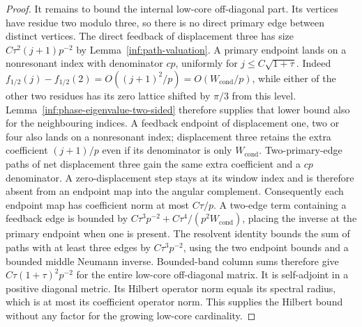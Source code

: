 \begin{proof}
It remains to bound the internal low-core off-diagonal part.
Its vertices have residue two modulo three, so there is no direct
primary edge between distinct vertices. The direct feedback of
displacement three has size
$C\tau^2(j+1)p^{-2}$ by Lemma~\ref{inf:path-valuation}.
A primary endpoint lands on a nonresonant index with denominator
$cp$, uniformly for $j\le C\sqrt{1+\tau}$.
Indeed $f_{1/2}(j)-f_{1/2}(2)=O((j+1)^2/p)=O(W_{\mathrm{cond}}/p)$,
while either of the other two residues has its zero lattice shifted
by $\pi/3$ from this level. Lemma~\ref{inf:phase-eigenvalue-two-sided}
therefore supplies that lower bound also for the neighbouring indices.
A feedback endpoint of displacement one, two or four also lands
on a nonresonant index; displacement three retains the extra
coefficient $(j+1)/p$ even if its denominator is only
$W_{\mathrm{cond}}$. Two-primary-edge paths of net displacement
three gain the same extra coefficient and a $cp$ denominator.
A zero-displacement step stays at its window index and is therefore
absent from an endpoint map into the angular complement.
Consequently each endpoint map has coefficient norm at most
$C\tau/p$. A two-edge term containing a feedback edge is bounded by
$C\tau^3p^{-2}+C\tau^4/(p^2W_{\mathrm{cond}})$, placing the inverse
at the primary endpoint when one is present.
The resolvent identity bounds the sum of paths with at least three
edges by $C\tau^3p^{-2}$, using the two endpoint bounds and a
bounded middle Neumann inverse. Bounded-band column sums therefore give
$C\tau(1+\tau)^2p^{-2}$ for the entire low-core off-diagonal matrix.
It is self-adjoint in a positive diagonal metric. Its Hilbert
operator norm equals its spectral radius, which is at most its
coefficient operator norm. This supplies the Hilbert bound without
any factor for the growing low-core cardinality.
\end{proof}

